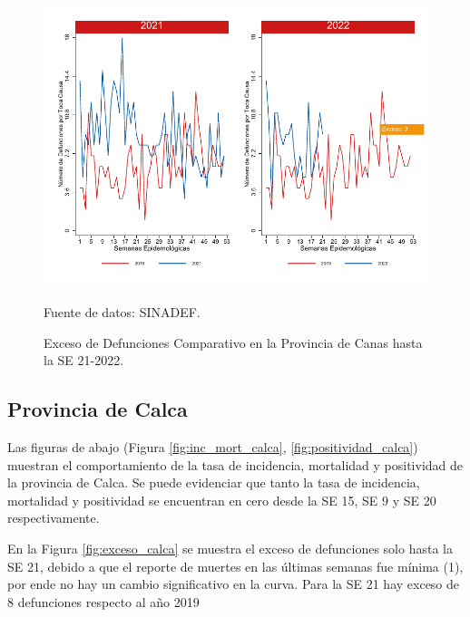 \documentclass[12pt,a4paper,openany]{book}
\begin{document}
	\begin{figure}[h]
		\caption{Exceso de Defunciones Comparativo en la Provincia de Canas hasta la SE 21-2022.}\label{fig:exceso_canas}
		\begin{center}
			\includegraphics[width=0.7\linewidth]{../figuras/exceso_3.pdf}
		\end{center}
		{\footnotesize {Fuente de datos: SINADEF.}}
	\end{figure}
	
	\clearpage
	
	\subsection*{Provincia de Calca}
	\noindent Las figuras de abajo (Figura \ref{fig:inc_mort_calca}, \ref{fig:positividad_calca}) muestran el comportamiento de la tasa de incidencia, mortalidad y  positividad de  la provincia de Calca. Se puede evidenciar que tanto la tasa de incidencia, mortalidad y positividad se encuentran en cero desde la SE 15, SE 9 y SE 20 respectivamente. 
	
	En la Figura \ref{fig:exceso_calca} se muestra el exceso de defunciones solo hasta la SE 21, debido a que el reporte de muertes en las últimas semanas fue mínima (1), por ende no hay un cambio significativo en la curva. Para la SE 21 hay exceso de 8 defunciones respecto al año 2019
	
\end{document}
